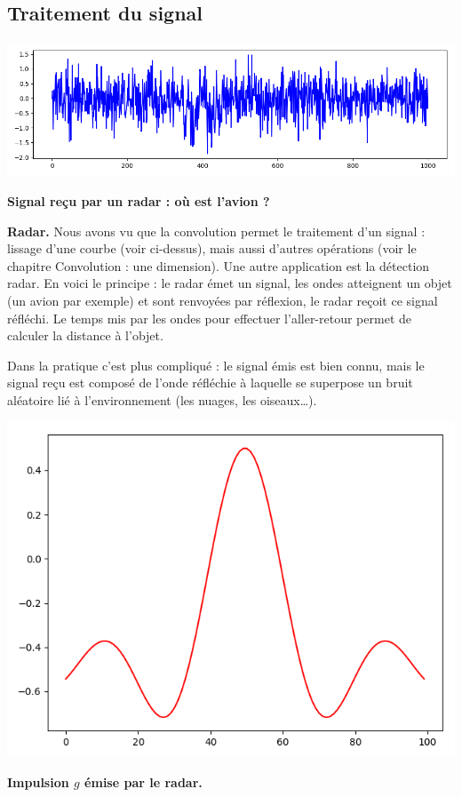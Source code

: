 \documentclass[11pt,class=report,crop=false]{standalone}
\begin{document}
\subsection{Traitement du signal}

\begin{center}
\includegraphics[scale=\myscale,scale=0.5]{figures/correlation1d-3}

\textbf{Signal reçu par un radar : où est l'avion ?}
\end{center}



\textbf{Radar.}
Nous avons vu que la convolution permet le traitement d'un signal : lissage d'une courbe (voir ci-dessus), mais aussi d'autres opérations (voir le chapitre \og{}Convolution : une dimension\fg{}).
Une autre application est la détection radar.
En voici le principe : le radar émet un signal, les ondes atteignent un objet (un avion par exemple) et sont renvoyées par réflexion, le radar reçoit ce signal réfléchi. Le temps mis par les ondes pour effectuer l'aller-retour permet de calculer la distance à l'objet.




Dans la pratique c'est plus compliqué : le signal émis est bien connu, mais le signal reçu est composé de l'onde réfléchie à laquelle se superpose un bruit aléatoire lié à l'environnement (les nuages, les oiseaux\ldots).


\begin{center}
\includegraphics[scale=\myscale,scale=0.4]{figures/correlation1d-1}

\textbf{Impulsion $g$ émise par le radar.}
\end{center}
\end{document}
